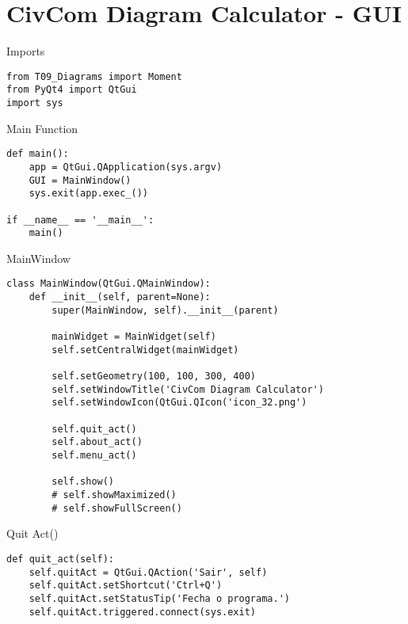 \documentclass[presentation]{beamer}
\begin{document}
\section{CivCom Diagram Calculator - GUI}
\label{sec:orgheadline29}
\begin{frame}[fragile,label={sec:orgheadline18}]{Imports}
 \begin{verbatim}
from T09_Diagrams import Moment
from PyQt4 import QtGui
import sys
\end{verbatim}
\end{frame}
\begin{frame}[fragile,label={sec:orgheadline19}]{Main Function}
 \begin{verbatim}
def main():
    app = QtGui.QApplication(sys.argv)
    GUI = MainWindow()
    sys.exit(app.exec_())

if __name__ == '__main__':
    main()
\end{verbatim}
\end{frame}
\begin{frame}[fragile,label={sec:orgheadline20}]{MainWindow}
 \begin{verbatim}
class MainWindow(QtGui.QMainWindow): 
    def __init__(self, parent=None):
        super(MainWindow, self).__init__(parent)
        
        mainWidget = MainWidget(self)
        self.setCentralWidget(mainWidget)

        self.setGeometry(100, 100, 300, 400)
        self.setWindowTitle('CivCom Diagram Calculator')
        self.setWindowIcon(QtGui.QIcon('icon_32.png')
 
        self.quit_act()
        self.about_act()
        self.menu_act() 
     
        self.show()
        # self.showMaximized()
        # self.showFullScreen()
\end{verbatim}
\end{frame}
\begin{frame}[fragile,label={sec:orgheadline21}]{Quit Act()}
 \begin{verbatim}
def quit_act(self):
    self.quitAct = QtGui.QAction('Sair', self)
    self.quitAct.setShortcut('Ctrl+Q')
    self.quitAct.setStatusTip('Fecha o programa.')
    self.quitAct.triggered.connect(sys.exit)
\end{verbatim}
\end{frame}
\end{document}
